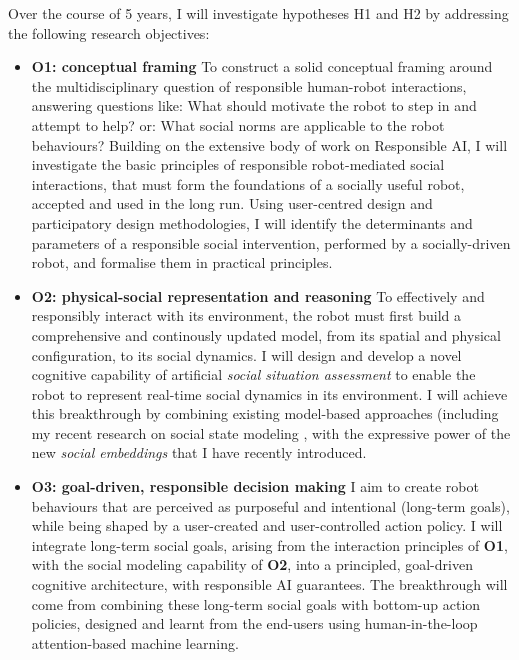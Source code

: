 Over the course of 5 years, I will investigate hypotheses H1 and H2
by addressing the following research objectives:

\begin{itemize}
    \item \textbf{O1: conceptual framing} To construct a solid conceptual
        framing around the multidisciplinary question of responsible human-robot
        interactions, answering questions like: What should motivate the robot
        to step in and attempt to help? or: What social norms are applicable to
        the robot behaviours? Building on the extensive body of work on
        Responsible AI, I will investigate the basic principles of
        responsible robot-mediated social interactions, that must form the
        foundations of a socially useful robot, accepted and used in the long
        run.  Using user-centred design and participatory design methodologies,
        I will identify the determinants and parameters of a responsible social
        intervention, performed by a socially-driven robot, and formalise them
        in practical principles.

    \item \textbf{O2: physical-social representation and reasoning} To
        effectively and responsibly interact with its environment, the robot
        must first build a comprehensive and continously updated model, from its
        spatial and physical configuration, to its social dynamics. I will
        design and develop a novel cognitive capability of artificial
        \emph{social situation assessment} to enable the robot to represent
        real-time social dynamics in its environment. I will achieve this
        breakthrough by combining existing model-based approaches 
        (including my recent research on social state modeling , with
        the expressive power of the new \emph{social embeddings} that I have
        recently introduced.

    \item {\bf O3: goal-driven, responsible decision making} I aim to create
        robot behaviours that are perceived as purposeful and intentional
        (long-term goals), while being shaped by a user-created and
        user-controlled action policy.  I will integrate long-term social goals,
        arising from the interaction principles of \textbf{O1}, with the social
        modeling capability of \textbf{O2}, into a principled, goal-driven
        cognitive architecture, with responsible AI guarantees. The breakthrough
        will come from combining these long-term social goals with bottom-up
        action policies, designed and learnt from the end-users using
        human-in-the-loop attention-based machine learning.


\end{itemize}

